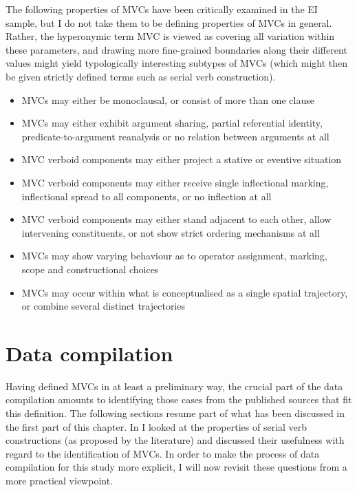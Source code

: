 The following properties of MVCs have been critically examined in the EI sample, but I do not take them to be defining properties of MVCs in general. Rather, the hyperonymic term MVC is viewed as covering all variation within these parameters, and drawing more fine-grained boundaries along their different values might yield typologically interesting subtypes of MVCs (which might then be given strictly defined terms such as serial verb construction).

\begin{itemize}
\item MVCs may either be monoclausal, or consist of more than one clause
\item MVCs may either exhibit argument sharing, partial referential identity, predicate-to-argument reanalysis or no relation between arguments at all
\item MVC verboid components may either project a stative or eventive situation
\item MVC verboid components may either receive single inflectional marking, inflectional spread to all components, or no inflection at all
\item MVC verboid components may either stand adjacent to each other, allow intervening constituents, or not show strict ordering mechanisms at all
\item MVCs may show varying behaviour as to operator assignment, marking, scope and constructional choices
\item MVCs may occur within what is conceptualised as a single spatial trajectory, or combine several distinct trajectories 
\end{itemize}

\section{Data compilation}

Having defined MVCs in at least a preliminary way, the crucial part of the data compilation amounts to identifying those cases from the published sources that fit this definition. The following sections resume part of what has been discussed in the first part of this chapter. In  I looked at the properties of serial verb constructions (as proposed by the literature) and discussed their usefulness with regard to the identification of MVCs. In order to make the process of data compilation for this study more explicit, I will now revisit these questions from a more practical viewpoint.

